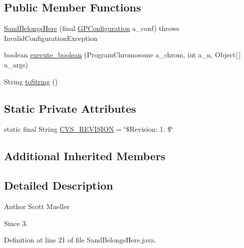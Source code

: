 \subsection*{Public Member Functions}
\begin{DoxyCompactItemize}
\item 
\hyperlink{classexamples_1_1gp_1_1painted_desert_1_1_sand_belongs_here_ad046d2a35ab2ce50216b273383d23d7b}{Sand\-Belongs\-Here} (final \hyperlink{classorg_1_1jgap_1_1gp_1_1impl_1_1_g_p_configuration}{G\-P\-Configuration} a\-\_\-conf)  throws Invalid\-Configuration\-Exception 
\item 
boolean \hyperlink{classexamples_1_1gp_1_1painted_desert_1_1_sand_belongs_here_a3a24e7678eb7f89f68e6107316f3021c}{execute\-\_\-boolean} (Program\-Chromosome a\-\_\-chrom, int a\-\_\-n, Object\mbox{[}$\,$\mbox{]} a\-\_\-args)
\item 
String \hyperlink{classexamples_1_1gp_1_1painted_desert_1_1_sand_belongs_here_a2d7292d3aef2014c04e231eb33ba2f96}{to\-String} ()
\end{DoxyCompactItemize}
\subsection*{Static Private Attributes}
\begin{DoxyCompactItemize}
\item 
static final String \hyperlink{classexamples_1_1gp_1_1painted_desert_1_1_sand_belongs_here_a2fd42d7bace68ff4c87789513337daeb}{C\-V\-S\-\_\-\-R\-E\-V\-I\-S\-I\-O\-N} = \char`\"{}\$Revision\-: 1. \$\char`\"{}
\end{DoxyCompactItemize}
\subsection*{Additional Inherited Members}


\subsection{Detailed Description}
\begin{DoxyAuthor}{Author}
Scott Mueller 
\end{DoxyAuthor}
\begin{DoxySince}{Since}
3. 
\end{DoxySince}


Definition at line 21 of file Sand\-Belongs\-Here.\-java.



